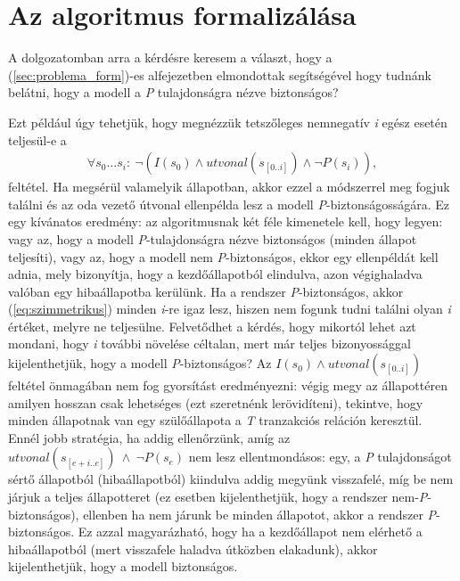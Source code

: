 \section{Az algoritmus formalizálása}
\label{sec:formalizalt_alg}

A dolgozatomban arra a kérdésre keresem a választ, hogy a (\ref{sec:problema_form})-es alfejezetben elmondottak segítségével hogy tudnánk belátni, hogy a modell a \emph{P} tulajdonságra nézve biztonságos?

Ezt például úgy tehetjük, hogy megnézzük tetszőleges nemnegatív \emph{i} egész esetén teljesül-e a
\begin{align}
	\label{eq:szimmetrikus}
	\forall s_{0} \dots s_{i}:~\neg(I(s_{0}) \wedge \mathit{utvonal}(s_{[0..i]}) \wedge \neg P(s_{i})),
\end{align}
feltétel. Ha megsérül valamelyik állapotban, akkor ezzel a módszerrel meg fogjuk találni és az oda vezető útvonal ellenpélda lesz a modell \emph{P}-biztonságosságára. Ez egy kívánatos eredmény: az algoritmusnak két féle kimenetele kell, hogy legyen: vagy az, hogy a modell \emph{P}-tulajdonságra nézve biztonságos (minden állapot teljesíti), vagy az, hogy a modell nem \emph{P}-biztonságos, ekkor egy ellenpéldát kell adnia, mely bizonyítja, hogy a  kezdőállapotból elindulva, azon végighaladva valóban egy hibaállapotba kerülünk.
\newline
\newline
Ha a rendszer \emph{P}-biztonságos, akkor (\ref{eq:szimmetrikus}) minden \emph{i}-re igaz lesz, hiszen nem fogunk tudni találni olyan \emph{i} értéket, melyre ne teljesülne. Felvetődhet a kérdés, hogy mikortól lehet azt mondani, hogy \emph{i} további növelése céltalan, mert már teljes bizonyossággal kijelenthetjük, hogy a modell \emph{P}-biztonságos? Az $I(s_{0}) \wedge \mathit{utvonal}(s_{[0..i]})$ feltétel önmagában nem fog gyorsítást eredményezni: végig megy az állapottéren amilyen hosszan csak lehetséges (ezt szeretnénk lerövidíteni), tekintve, hogy minden állapotnak van egy szülőállapota a \emph{T} tranzakciós reláción keresztül.
\newline
\newline
Ennél jobb stratégia, ha addig ellenőrzünk, amíg az $\mathit{utvonal}(s_{[e+i..e]})~\wedge~\neg P(s_{e})$ nem lesz ellentmondásos: egy, a \emph{P} tulajdonságot sértő állapotból (hibaállapotból) kiindulva addig megyünk visszafelé, míg be nem járjuk a teljes állapotteret (ez esetben kijelenthetjük, hogy a rendszer nem-\emph{P}-biztonságos), ellenben ha nem járunk be minden állapotot, akkor a rendszer \emph{P}-biztonságos. Ez azzal magyarázható, hogy ha a kezdőállapot nem elérhető a hibaállapotból (mert visszafele haladva útközben elakadunk), akkor kijelenthetjük, hogy a modell biztonságos.
